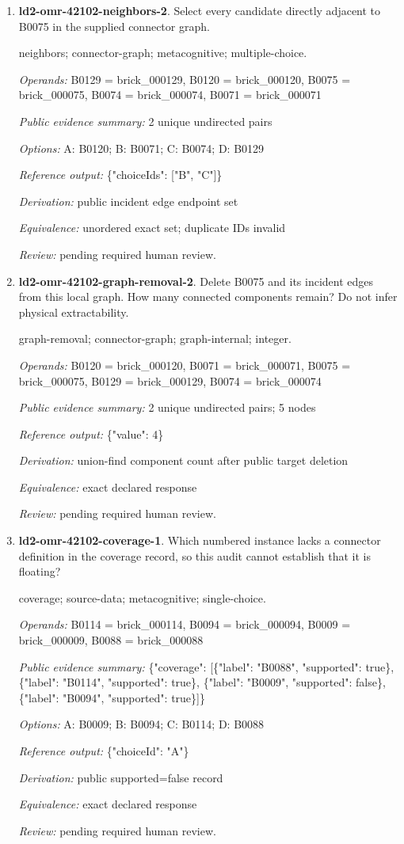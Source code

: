 \begin{enumerate}
\item \textbf{ld2-omr-42102-neighbors-2}. Select every candidate directly adjacent to B0075 in the supplied connector graph.
\par{\small neighbors; connector-graph; metacognitive; multiple-choice.\par\textit{Operands:} B0129 = brick\_000129, B0120 = brick\_000120, B0075 = brick\_000075, B0074 = brick\_000074, B0071 = brick\_000071\par\textit{Public evidence summary:} 2 unique undirected pairs\par\textit{Options:} A: B0120; B: B0071; C: B0074; D: B0129\par\textit{Reference output:} \{"choiceIds": ["B", "C"]\}\par\textit{Derivation:} public incident edge endpoint set\par\textit{Equivalence:} unordered exact set; duplicate IDs invalid\par\textit{Review:} pending required human review.}
\item \textbf{ld2-omr-42102-graph-removal-2}. Delete B0075 and its incident edges from this local graph. How many connected components remain? Do not infer physical extractability.
\par{\small graph-removal; connector-graph; graph-internal; integer.\par\textit{Operands:} B0120 = brick\_000120, B0071 = brick\_000071, B0075 = brick\_000075, B0129 = brick\_000129, B0074 = brick\_000074\par\textit{Public evidence summary:} 2 unique undirected pairs; 5 nodes\par\textit{Reference output:} \{"value": 4\}\par\textit{Derivation:} union-find component count after public target deletion\par\textit{Equivalence:} exact declared response\par\textit{Review:} pending required human review.}
\item \textbf{ld2-omr-42102-coverage-1}. Which numbered instance lacks a connector definition in the coverage record, so this audit cannot establish that it is floating?
\par{\small coverage; source-data; metacognitive; single-choice.\par\textit{Operands:} B0114 = brick\_000114, B0094 = brick\_000094, B0009 = brick\_000009, B0088 = brick\_000088\par\textit{Public evidence summary:} \{"coverage": [\{"label": "B0088", "supported": true\}, \{"label": "B0114", "supported": true\}, \{"label": "B0009", "supported": false\}, \{"label": "B0094", "supported": true\}]\}\par\textit{Options:} A: B0009; B: B0094; C: B0114; D: B0088\par\textit{Reference output:} \{"choiceId": "A"\}\par\textit{Derivation:} public supported=false record\par\textit{Equivalence:} exact declared response\par\textit{Review:} pending required human review.}

\end{enumerate}
